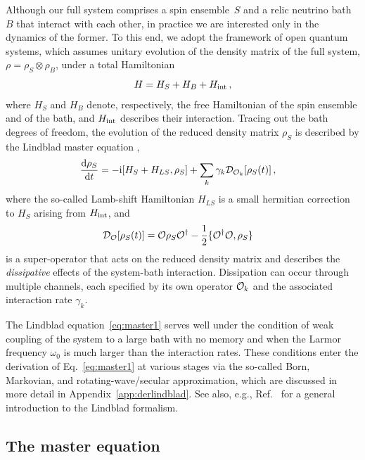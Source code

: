\documentclass[aps,prd,10pt,twocolumn,superscriptaddress,floatfix,nofootinbib,amsmath,amssymb,altaffilletter,preprintnumbers]{revtex4-1}
\newcommand{\G}[1]{\textcolor{orange}{\textbf{GP:} #1}}
\begin{document}
Although our full system comprises a spin ensemble~$S$ and a relic neutrino bath $B$ that interact with each other, in practice we are interested only in the dynamics of the former.  To this end, we adopt the framework of open quantum systems, which assumes unitary evolution of the density matrix of the full system, $\rho = \rho_S \otimes \rho_B$, under a total Hamiltonian
\begin{equation}
    H=H_S+H_B+H_{\rm int}\, ,
\end{equation} 
where $H_S$ and $H_B$ denote, respectively, the free Hamiltonian of the spin ensemble and of the bath, and $H_{\rm int}$ describes their interaction.  Tracing out the bath degrees of freedom, the evolution of the reduced density matrix $\rho_S$ is described by the Lindblad master equation \cite{Lindblad:1975ef,Gorini:1975nb, Manzano:2020yyw}, 
\begin{align}
        \frac{\mathrm{d} \rho_S}{\mathrm{d}t} & =-{\rm i}[H_S+H_{LS}, \rho_S]+\sum_k \gamma_k{\cal D}_{{\cal O}_k}[\rho_S(t)]\, ,
        \label{eq:master1}
\end{align}
where the so-called Lamb-shift Hamiltonian  $H_{LS}$ is a small hermitian correction to $H_S$ arising from $H_{\rm int}$, and
\begin{align}
        {\cal D}_{\cal O}[\rho_S(t)]&={\cal O}\rho_S{\cal O}^{\dagger}-\frac{1}{2}\{{\cal O}^{\dagger}{\cal O}, \rho_S\}\label{eq:calD}
\end{align} 
is a super-operator that acts on the reduced density matrix and describes the \emph{dissipative} effects of the system-bath interaction. Dissipation can occur through multiple channels, each specified by its own operator ${\cal O}_k$ and the associated interaction rate $\gamma_k$. 

The Lindblad equation~\eqref{eq:master1} serves well under the condition of weak coupling of the system to a large bath with no memory and when the Larmor frequency $\omega_0$ is much larger than the interaction rates.  These conditions enter the derivation of Eq.~\eqref{eq:master1} at various stages via the so-called Born, Markovian, and rotating-wave/secular approximation, which are discussed in more detail in Appendix~\ref{app:derlindblad}.   See also, e.g., Ref.~\cite{Manzano:2020yyw} for a general introduction to the Lindblad formalism.




\subsection{The master equation}
\end{document}
